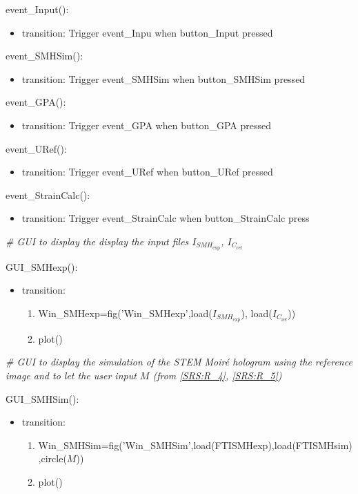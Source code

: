 \documentclass[12pt, titlepage]{article}
\begin{document}
\noindent event{\_}Input():
\begin{itemize}
\item transition: Trigger event{\_}Inpu when button{\_}Input pressed
\end{itemize}
\bigskip
\noindent event{\_}SMHSim():
\begin{itemize}
\item transition: Trigger event{\_}SMHSim when button{\_}SMHSim pressed
\end{itemize}
\bigskip
\noindent event{\_}GPA():
\begin{itemize}
\item transition: Trigger event{\_}GPA when button{\_}GPA pressed
\end{itemize}
\bigskip
\noindent event{\_}URef():
\begin{itemize}
\item transition: Trigger event{\_}URef when button{\_}URef pressed
\end{itemize}
\bigskip
\noindent event{\_}StrainCalc():
\begin{itemize}
\item transition: Trigger event{\_}StrainCalc when button{\_}StrainCalc press
\end{itemize}
\bigskip

\noindent\textit{{\#} GUI to display the display the input files $I_{\mathit{SMH}_{\text{exp}}}$, $I_{C_{\text{ref}}}$}\medskip

\noindent GUI{\_}SMHexp():
\begin{itemize}
\item transition: 
	\begin{enumerate}
	\item Win{\_}SMHexp=fig('Win{\_}SMHexp',load($I_{\mathit{SMH}_{\text{exp}}}$), load($I_{C_{\text{ref}}}$))
	\item plot()
	\end{enumerate} 
\end{itemize}
\bigskip


\noindent\textit{{\#} GUI to display the simulation of the STEM Moir{\'e} hologram using the reference image and to let the user input $M$ (from \cref{SRS:R_4}, \cref{SRS:R_5})}\medskip

\noindent GUI{\_}SMHSim():
\begin{itemize}
\item transition: 
	\begin{enumerate}
	\item Win{\_}SMHSim=fig('Win{\_}SMHSim',load(FTISMHexp),load(FTISMHsim),circle($M$))
	\item plot()
	\end{enumerate} 
\end{itemize}
\bigskip
\end{document}
